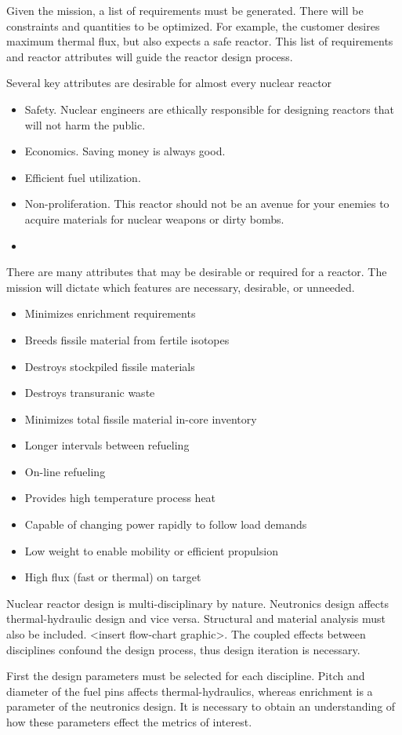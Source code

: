 \documentclass[]{article}
\begin{document}
Given the mission, a list of requirements must be generated. There will be constraints and quantities to be optimized. For example, the customer desires maximum thermal flux, but also expects a safe reactor. This list of requirements and reactor attributes will guide the reactor design process.

Several key attributes are desirable for almost every nuclear reactor
\begin{itemize}
  \item Safety. Nuclear engineers are ethically responsible for designing reactors that will not harm the public.
  \item Economics. Saving money is always good.
  \item Efficient fuel utilization. 
  \item Non-proliferation. This reactor should not be an avenue for your enemies to acquire materials for nuclear weapons or dirty bombs.
  \item
\end{itemize}
There are many attributes that may be desirable or required for a reactor. The mission will dictate which features are necessary, desirable, or unneeded.
\begin{itemize}
  \item Minimizes enrichment requirements
  \item Breeds fissile material from fertile isotopes
  \item Destroys stockpiled fissile materials
  \item Destroys transuranic waste
  \item Minimizes total fissile material in-core inventory
  \item Longer intervals between refueling
  \item On-line refueling
  \item Provides high temperature process heat
  \item Capable of changing power rapidly to follow load demands
  \item Low weight to enable mobility or efficient propulsion
  \item High flux (fast or thermal) on target
\end{itemize}

Nuclear reactor design is multi-disciplinary by nature. Neutronics design affects thermal-hydraulic design and vice versa. Structural and material analysis must also be included. <insert flow-chart graphic>. The coupled effects between disciplines confound the design process, thus design iteration is necessary.

First the design parameters must be selected for each discipline. Pitch and diameter of the fuel pins affects thermal-hydraulics, whereas enrichment is a parameter of the neutronics design. It is necessary to obtain an understanding of how these parameters effect the metrics of interest. 
\end{document}
